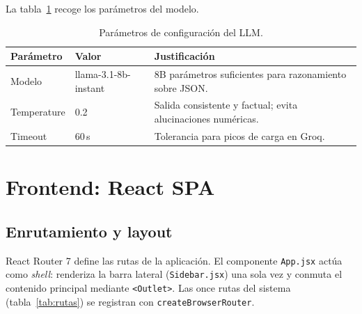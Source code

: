 \documentclass[12pt,twoside,titlepage]{report}
\begin{document}
La tabla~\ref{tab:llm_params} recoge los parámetros del modelo.

\begin{table}[H]
  \centering
  \caption{Parámetros de configuración del LLM.}
  \label{tab:llm_params}
  \begin{tabular}{ll>{\raggedright\arraybackslash}p{7cm}}
    \toprule
    \textbf{Parámetro} & \textbf{Valor} & \textbf{Justificación} \\
    \midrule
    Modelo       & llama-3.1-8b-instant & 8B parámetros suficientes para razonamiento sobre JSON. \\
    Temperature  & 0.2                  & Salida consistente y factual; evita alucinaciones numéricas. \\
    Timeout      & 60\,s                & Tolerancia para picos de carga en Groq. \\
    \bottomrule
  \end{tabular}
\end{table}


\section{Frontend: React SPA}

\subsection{Enrutamiento y layout}

React Router 7 \cite{reactrouter} define las rutas de la aplicación. El componente \texttt{App.jsx} actúa como \emph{shell}: renderiza la barra lateral (\texttt{Sidebar.jsx}) una sola vez y conmuta el contenido principal mediante \texttt{<Outlet>}. Las once rutas del sistema (tabla~\ref{tab:rutas}) se registran con \texttt{createBrowserRouter}.
\end{document}
